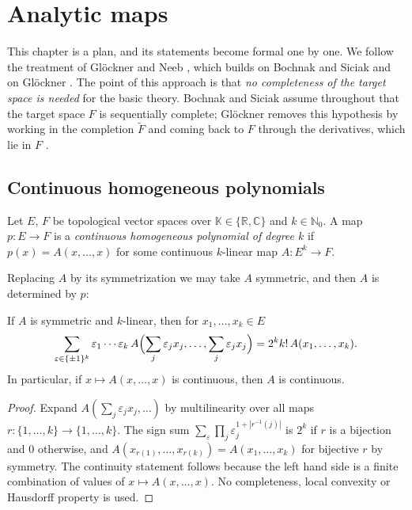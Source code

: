 \chapter{Analytic maps}
\label{chap:analytic}

This chapter is a plan, and its statements become formal one by one. We follow the treatment of
Glöckner and Neeb \cite[Ch.~2]{GN26}, which builds on Bochnak and Siciak \cite{BS71a, BS71b} and
on Glöckner \cite[§2]{Glo02}. The point of this approach is that \emph{no completeness of the
target space is needed} for the basic theory. Bochnak and Siciak assume throughout that the target
space $F$ is sequentially complete; Glöckner removes this hypothesis by working in the completion
$\widetilde F$ and coming back to $F$ through the derivatives, which lie in $F$
\cite[Prop.~2.4, Lemma~2.5]{Glo02}.

\section{Continuous homogeneous polynomials}

\begin{definition}
  \label{def:hom-poly}
  \leanok
  Let $E$, $F$ be topological vector spaces over $\mathbb{K} \in \{\mathbb{R}, \mathbb{C}\}$ and
  $k \in \mathbb{N}_0$. A map $p \colon E \to F$ is a \emph{continuous homogeneous polynomial of
  degree $k$} if $p(x) = A(x, \dots, x)$ for some continuous $k$-linear map
  $A \colon E^k \to F$.
\end{definition}

Replacing $A$ by its symmetrization we may take $A$ symmetric, and then $A$ is determined by $p$:

\begin{theorem}
  \label{thm:polarization}
  \leanok
  If $A$ is symmetric and $k$-linear, then for $x_1, \dots, x_k \in E$
  \[
    \sum_{\varepsilon \in \{\pm 1\}^k} \varepsilon_1 \cdots \varepsilon_k \,
    A\Bigl(\sum_j \varepsilon_j x_j, \dots, \sum_j \varepsilon_j x_j\Bigr)
    = 2^k k! \, A(x_1, \dots, x_k).
  \]
  In particular, if $x \mapsto A(x, \dots, x)$ is continuous, then $A$ is continuous.
\end{theorem}

\begin{proof}
  \leanok
  Expand $A(\sum_j \varepsilon_j x_j, \dots)$ by multilinearity over all maps
  $r \colon \{1, \dots, k\} \to \{1, \dots, k\}$. The sign sum
  $\sum_\varepsilon \prod_j \varepsilon_j^{1 + |r^{-1}(j)|}$ is $2^k$ if $r$ is a bijection and
  $0$ otherwise, and $A(x_{r(1)}, \dots, x_{r(k)}) = A(x_1, \dots, x_k)$ for bijective $r$ by
  symmetry. The continuity statement follows because the left hand side is a finite combination of
  values of $x \mapsto A(x, \dots, x)$. No completeness, local convexity or Hausdorff property is
  used.
\end{proof}

